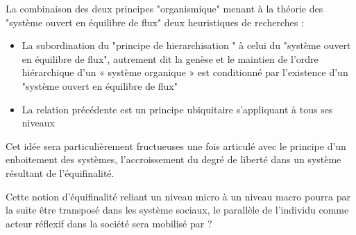 {%
 

La combinaison des deux principes "organismique" menant à la théorie des "système ouvert en équilibre de flux" deux heuristiques de recherches \autocite[481]{Pouvreau2013}:
\begin{itemize}
\item La subordination du "principe de hierarchisation " à celui du "système ouvert en équilibre de flux", autrement dit la genèse et le maintien de l’ordre hiérarchique d’un « système organique » est conditionné par l'existence d'un "système ouvert en équilibre de flux"
\item  La relation précédente est un principe ubiquitaire s’appliquant à tous ses niveaux
\end{itemize} 

Cet idée sera particulièrement fructueuses une fois articulé avec le principe d'un enboitement des systèmes, l'accroissement du degré de liberté dans un système résultant de l'équifinalité.
 \autocite[38]{Bertalanffy1973} \autocite[786-788]{Pouvreau2013}


Cette notion d'équifinalité reliant un niveau micro à un niveau macro pourra par la suite être transposé dans les système sociaux, le parallèle de l'individu comme acteur réflexif dans la société sera mobilisé par ?

}
